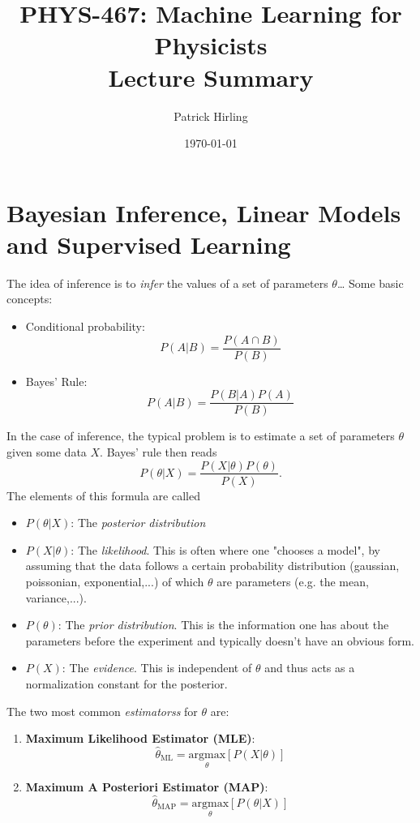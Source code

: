 \documentclass{article}
\title{PHYS-467: Machine Learning for Physicists\\\Large Lecture Summary}
\author{Patrick Hirling}
\date{\today}
\begin{document}
\maketitle
\section{Bayesian Inference, Linear Models and Supervised Learning}
The idea of inference is to \emph{infer} the values of a set of parameters $\theta$\dots
Some basic concepts:
\begin{itemize}
    \item Conditional probability:
        \begin{equation}
            P(A|B) = \frac{P(A \cap B)}{P(B)}
        \end{equation}
    \item Bayes' Rule:
        \begin{equation}
            P(A|B) = \frac{P(B|A) P(A)}{P(B)}
        \end{equation}
\end{itemize}
In the case of inference, the typical problem is to estimate a set of parameters $\theta$ given some data $X$. Bayes' rule then reads
\begin{equation}
    P(\theta|X) = \frac{P(X|\theta) P(\theta)}{P(X)}.
\end{equation}
The elements of this formula are called
\begin{itemize}
    \item $P(\theta|X)$: The \emph{posterior distribution}
    \item $P(X|\theta)$: The \emph{likelihood}. This is often where one "chooses a model", by assuming that the data follows a certain probability distribution (gaussian, poissonian, exponential,...) of which $\theta$ are parameters (e.g. the mean, variance,...).
    \item $P(\theta)$: The \emph{prior distribution}. This is the information one has about the parameters before the experiment and typically doesn't have an obvious form.
    \item $P(X)$: The \emph{evidence}. This is independent of $\theta$ and thus acts as a normalization constant for the posterior. 
\end{itemize}
The two most common \emph{estimatorss} for $\theta$ are:
\begin{enumerate}
    \item \textbf{Maximum Likelihood Estimator (MLE)}:
        \begin{equation*}
            \hat{\theta}_{\text{ML}}
            =
            \underset{\theta}{\text{argmax}} \left[ P(X|\theta) \right]
        \end{equation*}
    \item \textbf{Maximum A Posteriori Estimator (MAP)}:
        \begin{equation*}
            \hat{\theta}_{\text{MAP}}
            =
            \underset{\theta}{\text{argmax}} \left[ P(\theta|X) \right]
        \end{equation*}
\end{enumerate}
\end{document}
